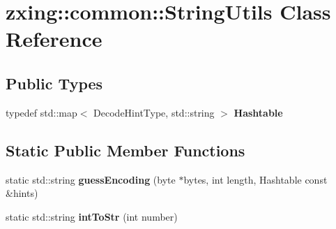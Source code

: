 \hypertarget{classzxing_1_1common_1_1_string_utils}{}\section{zxing\+:\+:common\+:\+:String\+Utils Class Reference}
\label{classzxing_1_1common_1_1_string_utils}
\subsection*{Public Types}
\begin{DoxyCompactItemize}
\item 
\mbox{\label{classzxing_1_1common_1_1_string_utils_a06ddca11823f4113e1f9670663607f01}} 
typedef std\+::map$<$ Decode\+Hint\+Type, std\+::string $>$ {\bfseries Hashtable}
\end{DoxyCompactItemize}
\subsection*{Static Public Member Functions}
\begin{DoxyCompactItemize}
\item 
\mbox{\label{classzxing_1_1common_1_1_string_utils_a9d81f1d324711a7524bdf77e37ed36f3}} 
static std\+::string {\bfseries guess\+Encoding} (byte $\ast$bytes, int length, Hashtable const \&hints)
\item 
\mbox{\label{classzxing_1_1common_1_1_string_utils_a917ebab9395c1a42c6f0dd9c80fa9a65}} 
static std\+::string {\bfseries int\+To\+Str} (int number)
\end{DoxyCompactItemize}
